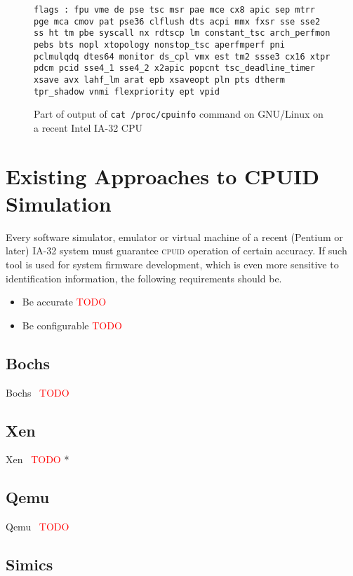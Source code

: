 \documentclass[a4paper,10pt,oneside,unicode]{article}
\newcommand{\cpuid}{\textsc{cpuid} }
\newcommand{\todo}[1][]{\textcolor{red}{TODO #1}}
\begin{document}
\begin{figure}
\noindent\texttt{flags           : fpu vme de pse tsc msr pae mce cx8 apic sep mtrr pge mca cmov pat pse36 clflush dts acpi mmx fxsr sse sse2 ss ht tm pbe syscall nx rdtscp lm constant\_tsc arch\_perfmon pebs bts nopl xtopology nonstop\_tsc aperfmperf pni pclmulqdq dtes64 monitor ds\_cpl vmx est tm2 ssse3 cx16 xtpr pdcm pcid sse4\_1 sse4\_2 x2apic popcnt tsc\_deadline\_timer xsave avx lahf\_lm arat epb xsaveopt pln pts dtherm tpr\_shadow vnmi flexpriority ept vpid
}
\caption{Part of output of \texttt{cat /proc/cpuinfo} command on GNU/Linux on a recent Intel IA-32 {CPU}}\label{fig:flags}
\end{figure} 


\section{Existing Approaches to CPUID Simulation}\label{sec:approaches}

Every software simulator, emulator or virtual machine of a recent (Pentium or later) IA-32 system must guarantee \cpuid operation of certain accuracy. If such tool is used for system firmware development, which is even more sensitive to identification information, the following requirements should be.

\begin{itemize}
\item Be accurate \todo
\item Be configurable \todo
\end{itemize}

\subsection{Bochs}

Bochs~\cite{bochs} \todo 

\subsection{Xen}

Xen~\cite{xen2006} \todo *

\subsection{Qemu}

Qemu~\cite{qemu} \todo 

\subsection{Simics}
\end{document}
